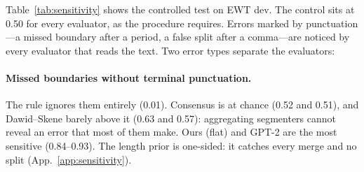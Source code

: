 \begin{table}[t]
  \centering
  \small
  \setlength{\tabcolsep}{2.6pt}
  \caption{V3 on EWT dev: detection rate of one injected error (Eq.~\ref{eq:detection}); $^{*}$ = 95\% CI above 0.5; the
  control should be 0.50. \textbf{Bold}: best among the flat-text rows and values within 0.02 of it (the control column
  is not ranked; the last row uses a different input and is shown for contrast). Missed boundary after terminal punctuation (term.), without it at a paragraph break (par.) or
  inside a paragraph (in-par.); false split after an abbreviation or numbering (abbr.) or after other punctuation
  (punct.). Ours (par.): paragraphs given. Documents with such a position: 260, 113, 60, 53, 173. All evaluators, error
  types and corpora in App.~\ref{app:sensitivity}.}
  \label{tab:sensitivity}
\end{table}

Table~\ref{tab:sensitivity} shows the controlled test on EWT dev. The control sits at 0.50 for every evaluator, as the
procedure requires. Errors marked by punctuation---a missed boundary after a period, a false split after a comma---are
noticed by every evaluator that reads the text. Two error types separate the evaluators:

\paragraph{Missed boundaries without terminal punctuation.} The rule ignores them entirely (0.01). Consensus is at chance
(0.52 and 0.51), and Dawid--Skene barely above it (0.63 and 0.57): aggregating segmenters cannot reveal an error that most
of them make. Ours (flat) and GPT-2 are the most sensitive (0.84--0.93). The length prior is one-sided: it catches every
merge and no split (App.~\ref{app:sensitivity}).

